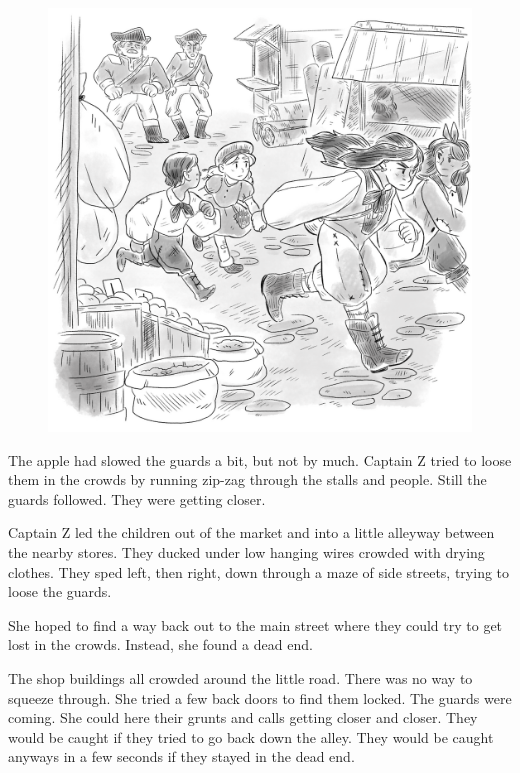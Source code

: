 \documentclass[12pt]{extbook}
\begin{document}
  \begin{figure}[htbp]
  \centering
  \includegraphics{img/running.png}
  \caption{}
  \end{figure}
  
  The apple had slowed the guards a bit, but not by much. Captain Z tried
  to loose them in the crowds by running zip-zag through the stalls and
  people. Still the guards followed. They were getting closer.
  
  Captain Z led the children out of the market and into a little alleyway
  between the nearby stores. They ducked under low hanging wires crowded
  with drying clothes. They sped left, then right, down through a maze of
  side streets, trying to loose the guards.
  
  She hoped to find a way back out to the main street where they could try
  to get lost in the crowds. Instead, she found a dead end.
  
  The shop buildings all crowded around the little road. There was no way
  to squeeze through. She tried a few back doors to find them locked. The
  guards were coming. She could here their grunts and calls getting closer
  and closer. They would be caught if they tried to go back down the
  alley. They would be caught anyways in a few seconds if they stayed in
  the dead end.
  
\end{document}
